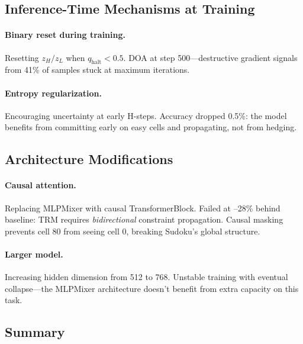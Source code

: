 \subsection{Inference-Time Mechanisms at Training}

\paragraph{Binary reset during training.} Resetting $z_H/z_L$ when
$q_\text{halt} < 0.5$. DOA at step 500---destructive gradient signals from 41\%
of samples stuck at maximum iterations.

\paragraph{Entropy regularization.} Encouraging uncertainty at early H-steps.
Accuracy dropped 0.5\%: the model benefits from committing early on easy cells
and propagating, not from hedging.

\subsection{Architecture Modifications}

\paragraph{Causal attention.} Replacing MLPMixer with causal TransformerBlock.
Failed at --28\% behind baseline: TRM requires \emph{bidirectional} constraint
propagation. Causal masking prevents cell 80 from seeing cell 0, breaking
Sudoku's global structure.

\paragraph{Larger model.} Increasing hidden dimension from 512 to 768. Unstable
training with eventual collapse---the MLPMixer architecture doesn't benefit from
extra capacity on this task.

\subsection{Summary}

